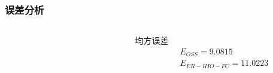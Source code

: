 \documentclass[12pt,aspectratio=169]{beamer} %
\begin{document}
\begin{frame}
    \frametitle{误差分析}
    \begin{columns}
        \begin{column}{0.7\textwidth}
            \begin{figure}
                \qquad
            \end{figure}
        \end{column}
        \begin{column}{0.3\textwidth}
            \begin{block}{均方误差}
                \small \begin{align*}
                    &E_{OSS}=9.0815\\
                    &E_{ER-HIO-FC}=11.0223
                \end{align*}
            \end{block}
        \end{column}
    \end{columns}
\end{frame}
\end{document}

